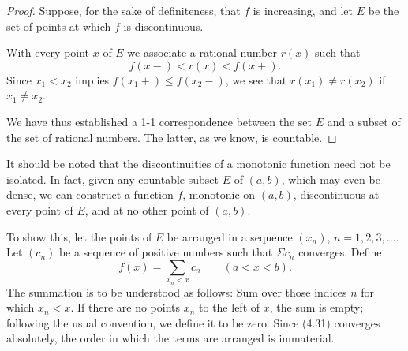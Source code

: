 \begin{proof}
Suppose, for the sake of definiteness, that $f$ is increasing, and let $E$ be
the set of points at which $f$ is discontinuous.

With every point $x$ of $E$ we associate a rational number $r(x)$ such that
\[ f(x-) < r(x) < f(x+). \]
Since $x_1 < x_2$ implies $f(x_1+) \le f(x_2-)$, we see that
$r(x_1) \ne r(x_2)$ if $x_1 \ne x_2$.

We have thus established a 1-1 correspondence between the set $E$ and a
subset of the set of rational numbers. The latter, as we know, is
countable.
\end{proof}

It should be noted that the discontinuities of a monotonic function need not
be isolated. In fact, given any countable subset $E$ of $(a,b)$, which may
even be dense, we can construct a function $f$, monotonic on $(a,b)$,
discontinuous at every point of $E$, and at no other point of $(a,b)$.

To show this, let the points of $E$ be arranged in a sequence $(x_n)$,
$n = 1,2,3,\dots$. Let $(c_n)$ be a sequence of positive numbers such that
$\Sigma c_n$ converges. Define
\begin{equation}
  f(x) = \sum_{x_n<x} c_n \qquad (a < x < b). \tag{4.31}
\end{equation}
The summation is to be understood as follows: Sum over those indices $n$ for
which $x_n < x$. If there are no points $x_n$ to the left of $x$, the sum is
empty; following the usual convention, we define it to be zero. Since (4.31)
converges absolutely, the order in which the terms are arranged is
immaterial.

